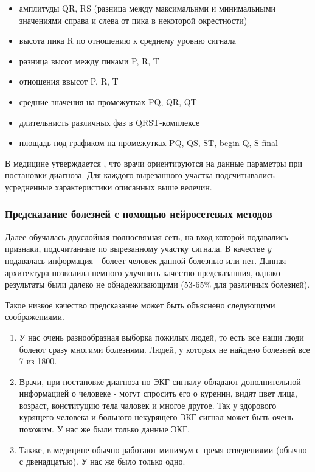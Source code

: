 \begin{itemize}
	\item амплитуды QR, RS (разница между максимальнми и минимальными значениями справа и слева от пика в некоторой окрестности)
	\item высота пика R по отношению к среднему уровню сигнала
	\item разница высот между пиками P, R, T
	\item отношения ввысот P, R, T
	\item средние значения на промежутках PQ, QR, QT
	\item длительнисть различных фаз в QRST-комплексе
	\item площадь под графиком на промежутках PQ, QS, ST, begin-Q, S-final
\end{itemize}


В медицине утверждается \cite{p_wave, T_wave}, что врачи ориентируются на данные параметры при постановки диагноза.
Для каждого вырезанного участка подсчитывались усредненные характеристики описанных выше велечин.

\subsubsection{Предсказание болезней с помощью нейросетевых методов}

Далее обучалась двуслойная полносвязная сеть, на вход которой подавались признаки, подсчитанные по вырезанному участку сигнала. В качестве $y$ подавалась информация - болеет человек данной болезнью или нет. Данная архитектура позволила немного улучшить качество предсказанния, однако результаты были далеко не обнадеживающими (53-65\% для различных болезней).

Такое низкое качество предсказание может быть объяснено следующими соображениями.
\begin{enumerate}
	\item У нас очень разнообразная выборка пожилых людей, то есть все наши люди болеют сразу многими болезнями. Людей, у которых не найдено болезней все 7 из 1800.
	\item Врачи, при постановке диагноза по ЭКГ сигналу обладают дополнительной информацией о человеке - могут спросить его о курении, видят цвет лица, возраст, конституцию тела чаловек и многое другое. Так у здорового курящего человека и больного некурящего ЭКГ сигнал может быть очень похожим. У нас же были только данные ЭКГ.
	\item  Также, в медицине обычно работают минимум с тремя отведениями (обычно с двенадцатью). У нас же было только одно.
\end{enumerate}


